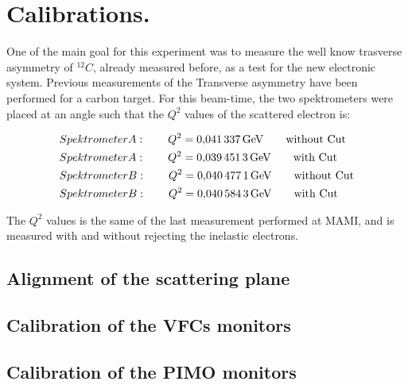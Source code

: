 \section{Calibrations.}

One of the main goal for this experiment was to measure the well know trasverse asymmetry of $^{12}C$, already measured before, as a test for the new electronic system. Previous measurements of the Transverse asymmetry have been performed for a carbon target. For this beam-time, the two spektrometers were placed at an angle such that the $Q^{2}$ values of the scattered electron is:

\begin{flushleft}
\begin{align*}
& Spektrometer A : \qquad Q^{2} = \SI{0.041337}{\giga \electronvolt} \qquad \textnormal{without Cut} \\
& Spektrometer A : \qquad Q^{2} = \SI{0.0394513}{\giga \electronvolt} \qquad \textnormal{with Cut} \\
& Spektrometer B : \qquad Q^{2} = \SI{0.0404771}{\giga \electronvolt} \qquad \textnormal{without Cut} \\
& Spektrometer B : \qquad Q^{2} = \SI{0.0405843}{\giga \electronvolt} \qquad \textnormal{with Cut} 
\end{align*} 
\end{flushleft}

The $Q^{2}$ values is the same of the last measurement performed at MAMI, and is measured with and without rejecting the inelastic electrons. 



\subsection{Alignment of the scattering plane}

\subsection{Calibration of the VFCs monitors}

\subsection{Calibration of the PIMO monitors}


